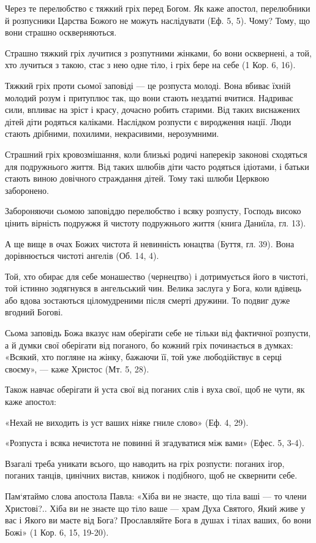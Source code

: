 \documentclass[main.tex]{subfiles}
\begin{document}
Через те перелюбство є тяжкий гріх перед Богом. Як каже апостол, перелюбники й розпусники Царства Божого не можуть наслідувати (Еф. 5, 5). Чому? Тому, що вони страшно оскверняються.

Страшно тяжкий гріх лучитися з розпутними жінками, бо вони осквернені, а той, хто лучиться з такою, стає з нею одне тіло, і гріх бере на себе (1 Кор. 6, 16).
 
Тяжкий гріх проти сьомої заповіді — це розпуста молоді. Вона вбиває їхній молодий розум і притуплює так, що вони стають нездатні вчитися. Надриває сили, впливає на зріст і красу, дочасно робить старими. Від таких виснажених дітей діти родяться каліками. Наслідком розпусти є виродження нації. Люди стають дрібними, похилими, некрасивими, нерозумними.

Страшний гріх кровозмішання, коли близькі родичі наперекір законові сходяться для подружнього життя. Від таких шлюбів діти часто родяться ідіотами, і батьки стають виною довічного страждання дітей. Тому такі шлюби Церквою заборонено.

Забороняючи сьомою заповіддю перелюбство і всяку розпусту, Господь високо цінить вірність подружжя й чистоту подружнього життя (книга Даниїла, гл. 13).

А ще вище в очах Божих чистота й невинність юнацтва (Буття, гл. 39). Вона дорівнюється чистоті ангелів (Об. 14, 4).

Той, хто обирає для себе монашество (чернецтво) і дотримується його в чистоті, той істинно зодягнувся в ангельський чин.
Велика заслуга у Бога, коли вдівець або вдова зостаються ціломудреними після смерті дружини. То подвиг дуже вгодний Богові.

Сьома заповідь Божа вказує нам оберігати себе не тільки від фактичної розпусти, а й думки свої оберігати від поганого, бо кожний гріх починається в думках: «Всякий, хто погляне на жінку, бажаючи її, той уже любодійствує в серці своєму», — каже Христос (Мт. 5, 28).

Також навчає оберігати й уста свої від поганих слів і вуха свої, щоб не чути, як каже апостол:

«Нехай не виходить із уст ваших ніяке гниле слово» (Еф. 4, 29).

«Розпуста і всяка нечистота не повинні й згадуватися між вами» (Ефес. 5, 3-4).

Взагалі треба уникати всього, що наводить на гріх розпусти: поганих ігор, поганих танців, цинічних вистав, книжок і подібного, щоб не сквернити себе.

Пам`ятаймо слова апостола Павла: «Хіба ви не знаєте, що тіла ваші — то члени Христові?.. Хіба ви не знаєте що тіло ваше — храм Духа Святого, Який живе у вас і Якого ви маєте від Бога? Прославляйте Бога в душах і тілах ваших, бо вони Божі» (1 Кор. 6, 15, 19-20).
\end{document}
